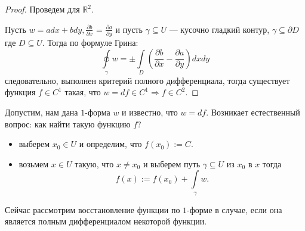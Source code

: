 \documentclass[a5paper]{article}
\theoremstyle{plain}
\theoremstyle{definition}
\numberwithin{through}{section}
\numberwithin{equation}{section}
\begin{document}
\begin{proof}
	Проведем для $\mathbb{R}^2$.
	
	Пусть $w = adx + bdy, \frac{\partial b}{\partial x}$ = $\frac{\partial a}{\partial y}$ и
	пусть $\gamma \subseteq U$ --- кусочно гладкий контур, $\gamma \subseteq \partial D$
	где $D \subseteq U$. Тогда по формуле Грина:
	\[ \oint\limits_\gamma w = \pm \int\limits_D \left( \frac{\partial b}{\partial x} -
	\frac{\partial a}{\partial y} \right) dxdy \]
	следовательно, выполнен критерий полного дифференциала, тогда существует функция 
	$f \in C^1$ такая, что $w = df \in C^1 \Rightarrow f \in C^2$.
\end{proof}

Допустим, нам дана $1$-форма $w$ и известно, что $w = df$. Возникает естественный вопрос: 
как найти такую функцию $f$?
\begin{itemize}
	\item
	выберем $x_0 \in U$ и определим, что $f(x_0) := C$.
	
	\item
	возьмем $x \in U$ такую, что $x \ne x_0$ и выберем путь $\gamma \subseteq U$ из $ x_0 $ в $x$
	тогда \[ f(x) := f(x_0) + \int\limits_\gamma w. \]
\end{itemize}

Сейчас рассмотрим восстановление функции по $1$-форме в случае, если она является полным дифференциалом некоторой функции.
\end{document}

